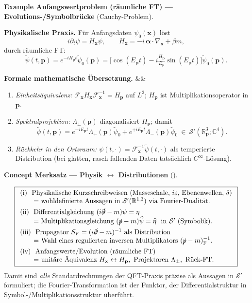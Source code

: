 \documentclass[10pt, letterpaper]{article}
\newcommand{\R}{\mathbb{R}}
\newcommand{\C}{\mathbb{C}}
\newcommand{\Cinf}{C^{\infty}}
\newenvironment{romanenum}[1][]
  {%
    \ifx&#1&
    \else
      \textbf{#1}\quad
    \fi
    \begin{enumerate}[label=\roman*)]
  }
  {%
    \end{enumerate}%
  }
\newcommand{\CustomHeading}[3]{%
  \par\medskip\noindent%
  \textbf{#1 #2} \textnormal{(#3)}.\enskip%
}
\newenvironment{EXA}[2]{\begin{unitbox}\CustomHeading{Example}{#1}{#2}}{\end{unitbox}}
\newenvironment{CONC}[2]{\begin{unitbox}\CustomHeading{Concept}{#1}{#2}}{\end{unitbox}}
\begin{document}
\begin{EXA}{Anfangswertproblem (räumliche FT) — Evolutions-/Symbolbrücke}{Cauchy-Problem}
\textbf{Physikalische Praxis.}
Für Anfangsdaten $\psi_0(\mathbf{x})$ löst
\[
i\partial_t\psi=H_{\mathbf{x}}\psi,\qquad
H_{\mathbf{x}}=-i\,\boldsymbol{\alpha}\!\cdot\!\nabla_{\mathbf{x}}+\beta m,
\]
durch räumliche FT:
\[
\tilde\psi(t,\mathbf{p})=e^{-iH_{\mathbf{p}}t}\tilde\psi_0(\mathbf{p})
=\Big[\cos(E_{\mathbf{p}}t)-i\tfrac{H_{\mathbf{p}}}{E_{\mathbf{p}}}\sin(E_{\mathbf{p}}t)\Big]\tilde\psi_0(\mathbf{p}).
\]

\medskip
\textbf{Formale mathematische Übersetzung.}
\begin{romanenum}
\item \emph{Einheitsäquivalenz:} $\mathcal{F}_{\mathbf{x}}H_{\mathbf{x}}\mathcal{F}_{\mathbf{x}}^{-1}=H_{\mathbf{p}}$ auf $L^2$; $H_{\mathbf{p}}$ ist Multiplikationsoperator in $\mathbf{p}$.
\item \emph{Spektralprojektion:} $\Lambda_\pm(\mathbf{p})$ diagonalisiert $H_{\mathbf{p}}$; damit
\[
\tilde\psi(t,\mathbf{p})=e^{-iE_{\mathbf{p}}t}\Lambda_+(\mathbf{p})\tilde\psi_0
+e^{+iE_{\mathbf{p}}t}\Lambda_-(\mathbf{p})\tilde\psi_0
\ \in\ \mathcal{S}'(\R^3_{\mathbf{p}};\C^4).
\]
\item \emph{Rückkehr in den Ortsraum:} $\psi(t,\cdot)=\mathcal{F}_{\mathbf{x}}^{-1}\tilde\psi(t,\cdot)$ als temperierte Distribution (bei glatten, rasch fallenden Daten tatsächlich $\Cinf$-Lösung).
\end{romanenum}
\end{EXA}




\begin{CONC}{Merksatz — Physik $\leftrightarrow$ Distributionen}{}
\[
\boxed{
\begin{array}{l}
\text{(i) \ Physikalische Kurzschreibweisen (Masseschale, $i\varepsilon$, Ebenenwellen, $\delta$)}\\
\qquad\text{= wohldefinierte Aussagen in }\mathcal{S}'(\R^{1,3})\text{ via Fourier-Dualität.}\\[4pt]
\text{(ii) \ Differentialgleichung }(i\slashed{\partial}-m)\psi=\eta\\
\qquad\text{= Multiplikationsgleichung }(\slashed{p}-m)\widehat{\psi}=\widehat{\eta}
\ \text{ in }\mathcal{S}'\ (\text{Symbolik}).\\[4pt]
\text{(iii) \ Propagator }S_F=(i\slashed{\partial}-m)^{-1}
\text{ als Distribution}\\
\qquad\text{= Wahl eines regulierten inversen Multiplikators }(\slashed{p}-m)^{-1}_{\mathrm{F}}.\\[4pt]
\text{(iv) \ Anfangswerte/Evolution (räumliche FT)}\\
\qquad\text{= unitäre Äquivalenz }H_{\mathbf{x}}\leftrightarrow H_{\mathbf{p}},\ \text{Projektoren }\Lambda_\pm,\ \text{Rück-FT}.
\end{array}}
\]
Damit sind \emph{alle} Standardrechnungen der QFT-Praxis präzise als Aussagen in $\mathcal{S}'$ formuliert; die Fourier-Transformation ist der Funktor, der Differentialstruktur in Symbol-/Multiplikationsstruktur überführt.
\end{CONC}
\end{document}
